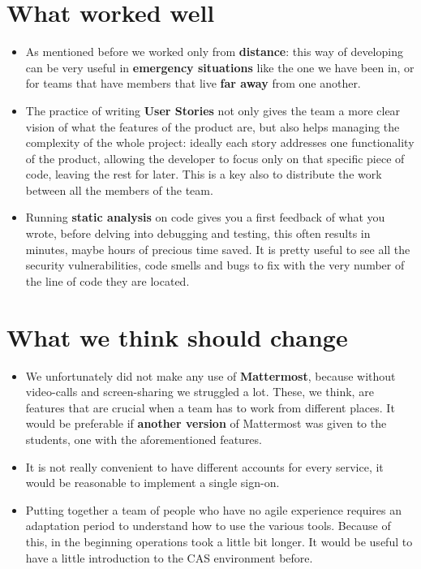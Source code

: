 \documentclass[a4paper,10pt]{report}
\begin{document}
\section{What worked well} %
\begin{itemize}
	\item As mentioned before we worked only from \textbf{distance}: this way of developing can be very useful in \textbf{emergency situations} like the one we have been in, or for teams that have members that live \textbf{far away} from one another.
	\item The practice of writing \textbf{User Stories} not only gives the team a more clear vision of what the features of the product are, but also helps managing the complexity of the whole project: ideally each story addresses one functionality of the product, allowing the developer to focus only on that specific piece of code, leaving the rest for later. This is a key also to distribute the work between all the members of the team.
	\item Running \textbf{static analysis} on code gives you a first feedback of what you wrote, before delving into debugging and testing, this often results in minutes, maybe hours of precious time saved. It is pretty useful to see all the security vulnerabilities, code smells and bugs to fix with the very number of the line of code they are located.
\end{itemize}
\section{What we think should change} %
\begin{itemize}
	\item We unfortunately did not make any use of \textbf{Mattermost}, because without video-calls and screen-sharing we struggled a lot. These, we think, are features that are crucial when a team has to work from different places. It would be preferable if \textbf{another version} of Mattermost was given to the students, one with the aforementioned features.
	\item It is not really convenient to have different accounts for every service, it would be reasonable to implement a single sign-on.
	\item Putting together a team of people who have no agile experience requires an adaptation period to understand how to use the various tools. Because of this, in the beginning operations took a little bit longer. It would be useful to have a little introduction to the CAS environment before.

\end{itemize}










\begin{abstract}
\end{abstract}
\end{document}
